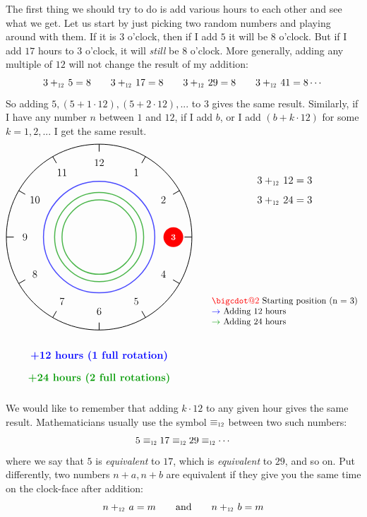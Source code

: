 \documentclass[oneside]{book}
\makeatletter
\newcommand\scalemath[2]{\scalebox{#1}{\mbox{\ensuremath{\displaystyle #2}}}}
\newcommand{\Equiv}[1]{\equiv_{\scalemath{0.6}{#1}}}
\newcommand{\Plus}[1]{+_{\scalemath{0.6}{#1}}\,}
\newcommand*\bigcdot{\mathpalette\bigcdot@{2}}
\newcommand*\bigcdot@[2]{\mathbin{\vcenter{\hbox{\scalebox{#2}{$\m@th#1\bullet$}}}}}
\makeatother
\begin{document}
The first thing we should try to do is add various hours to each other and see what we get. Let us start by
just picking two random numbers and playing around with them. If it is $3$ o'clock, then if I add $5$ it will
be $8$ o'clock. But if I add $17$ hours to $3$ o'clock, it will \emph{still} be $8$ o'clock. More generally,
adding any multiple of $12$ will not change the result of my addition:
\[
  3\Plus{12} 5 = 8\quad\quad 3\Plus{12}17 = 8 \quad\quad 3\Plus{12}29=8\quad\quad 3\Plus{12}41 = 8\cdots
\]
So adding $5,(5+1\cdot 12), (5+2\cdot 12), ...$ to $3$ gives the same result. Similarly, if I have any number
$n$ between $1$ and $12$, if I add $b$, or I add $(b + k\cdot 12)$ for some $k = 1,2,...$ I get the same
result.
\[
  \begin{tikzpicture}[scale=1.5]
  \draw[thick] (0,0) circle (2.5);

  \foreach \hour in {1,2,...,12} {
    \draw[thick] ({90-30*\hour}:2.3) -- ({90-30*\hour}:2.5);
    \node at ({90-30*\hour}:2.0) {\large \hour};
  }

  \node[circle, fill=red, text=white, minimum size=0.8cm] at ({90-30*3}:2.0) {\textbf{3}};

  \draw[->, very thick, blue, opacity=0.7] (0,0) circle (1.5);
  \node[blue, font=\large\bfseries] at (0,-3.2) {+12 hours (1 full rotation)};

  \draw[->, very thick, dkgreen, opacity=0.7] (0,0) circle (1.2);
  \draw[->, very thick, dkgreen, opacity=0.7] (0,0) circle (1.0);
  \node[dkgreen, font=\large\bfseries] at (0,-3.8) {+24 hours (2 full rotations)};


  \node[align=center, font=\large] at (5,1) {
    $3 \Plus{12} 12 = 3 $ \\[0.3cm]
    $3 \Plus{12} 24 = 3 $ \\[0.3cm]
  };

  \node[align=left, font=\normalsize] at (5,-2) {
    \textcolor{red}{$\bigcdot$} Starting position (n = 3) \\
    \textcolor{blue}{$\to$} Adding 12 hours \\
    \textcolor{dkgreen}{$\to$} Adding 24 hours
  };

\end{tikzpicture}
\]

We would like to remember that adding $k\cdot 12$ to any given hour gives
the same result. Mathematicians usually use the symbol $\Equiv{12}$ between two such numbers:
\[
  5\Equiv{12}17\Equiv{12}29\Equiv{12}\cdots
\]
where we say that $5$ is \emph{equivalent} to $17$, which is \emph{equivalent} to $29$, and so on. Put
differently, two numbers $n+a,n+b$ are equivalent if they give you the same time on the clock-face after addition:
\[
  n\Plus{12}a = m \qquad \text{and} \qquad n\Plus{12}b= m
\]
\end{document}
